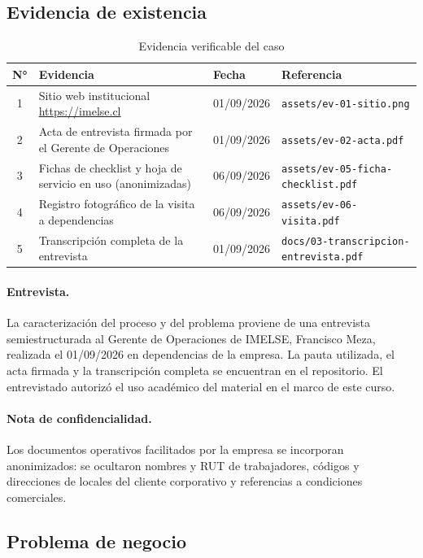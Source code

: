 \documentclass[10pt,letterpaper]{article}
\begin{document}
\subsection{Evidencia de existencia}

\begin{table}[H]
\centering
\small
\begin{tabular}{@{}clll@{}}
\toprule
\textbf{N°} & \textbf{Evidencia} & \textbf{Fecha} & \textbf{Referencia} \\
\midrule
1 & Sitio web institucional \url{https://imelse.cl} & 01/09/2026 & \texttt{assets/ev-01-sitio.png} \\
2 & Acta de entrevista firmada por el Gerente de Operaciones & 01/09/2026 & \texttt{assets/ev-02-acta.pdf} \\
3 & Fichas de checklist y hoja de servicio en uso (anonimizadas) & 06/09/2026 & \texttt{assets/ev-05-ficha-checklist.pdf} \\
4 & Registro fotográfico de la visita a dependencias & 06/09/2026 & \texttt{assets/ev-06-visita.pdf} \\
5 & Transcripción completa de la entrevista & 01/09/2026 & \texttt{docs/03-transcripcion-entrevista.pdf} \\
\bottomrule
\end{tabular}
\caption{Evidencia verificable del caso}
\end{table}

\paragraph{Entrevista.}
La caracterización del proceso y del problema proviene de una entrevista
semiestructurada al Gerente de Operaciones de IMELSE, Francisco Meza, realizada el
01/09/2026 en dependencias de la empresa. La pauta utilizada, el acta firmada y la transcripción
completa se encuentran en el repositorio. El entrevistado autorizó el uso académico
del material en el marco de este curso.

\paragraph{Nota de confidencialidad.}
Los documentos operativos facilitados por la empresa se incorporan anonimizados:
se ocultaron nombres y RUT de trabajadores, códigos y direcciones de locales del
cliente corporativo y referencias a condiciones comerciales.

\subsection{Problema de negocio}
\end{document}
